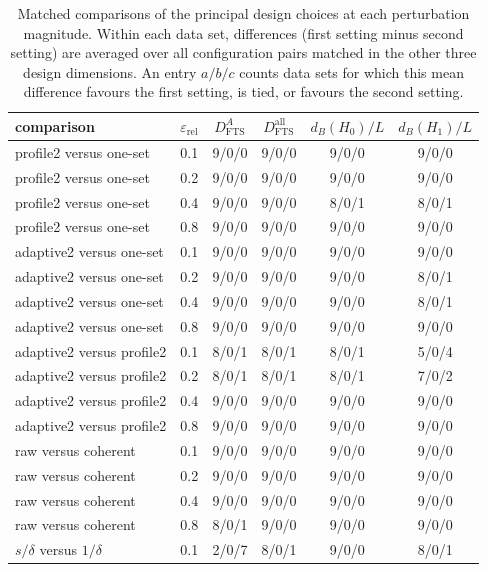 \documentclass[a4paper,11pt]{article}
\theoremstyle{definition}
\theoremstyle{remark}
\begin{document}
\begin{table}[!ht]
\centering
\scriptsize
\caption{Matched comparisons of the principal design choices at each perturbation magnitude. Within each data set, differences (first setting minus second setting) are averaged over all configuration pairs matched in the other three design dimensions. An entry $a/b/c$ counts data sets for which this mean difference favours the first setting, is tied, or favours the second setting.}
\label{tab:stability-design-contrasts}
\begin{tabular}{lccccc}
\toprule
comparison & $\varepsilon_{\mathrm{rel}}$ & $D_{\mathrm{FTS}}^A$ & $D_{\mathrm{FTS}}^{\mathrm{all}}$ & $d_B(H_0)/L$ & $d_B(H_1)/L$ \\
\midrule
profile2 versus one-set & 0.1 & 9/0/0 & 9/0/0 & 9/0/0 & 9/0/0 \\
profile2 versus one-set & 0.2 & 9/0/0 & 9/0/0 & 9/0/0 & 9/0/0 \\
profile2 versus one-set & 0.4 & 9/0/0 & 9/0/0 & 8/0/1 & 8/0/1 \\
profile2 versus one-set & 0.8 & 9/0/0 & 9/0/0 & 9/0/0 & 9/0/0 \\
\addlinespace
adaptive2 versus one-set & 0.1 & 9/0/0 & 9/0/0 & 9/0/0 & 9/0/0 \\
adaptive2 versus one-set & 0.2 & 9/0/0 & 9/0/0 & 9/0/0 & 8/0/1 \\
adaptive2 versus one-set & 0.4 & 9/0/0 & 9/0/0 & 9/0/0 & 8/0/1 \\
adaptive2 versus one-set & 0.8 & 9/0/0 & 9/0/0 & 9/0/0 & 9/0/0 \\
\addlinespace
adaptive2 versus profile2 & 0.1 & 8/0/1 & 8/0/1 & 8/0/1 & 5/0/4 \\
adaptive2 versus profile2 & 0.2 & 8/0/1 & 8/0/1 & 8/0/1 & 7/0/2 \\
adaptive2 versus profile2 & 0.4 & 9/0/0 & 9/0/0 & 9/0/0 & 9/0/0 \\
adaptive2 versus profile2 & 0.8 & 9/0/0 & 9/0/0 & 9/0/0 & 9/0/0 \\
\addlinespace
raw versus coherent & 0.1 & 9/0/0 & 9/0/0 & 9/0/0 & 9/0/0 \\
raw versus coherent & 0.2 & 9/0/0 & 9/0/0 & 9/0/0 & 9/0/0 \\
raw versus coherent & 0.4 & 9/0/0 & 9/0/0 & 9/0/0 & 9/0/0 \\
raw versus coherent & 0.8 & 8/0/1 & 9/0/0 & 9/0/0 & 9/0/0 \\
\addlinespace
$s/\delta$ versus $1/\delta$ & 0.1 & 2/0/7 & 8/0/1 & 9/0/0 & 8/0/1 \\

\end{tabular}
\end{table}
\end{document}
